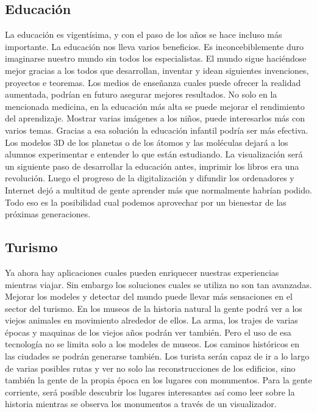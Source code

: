 \documentclass[a4paper,11pt]{scrartcl}
\begin{document}
\subsection{Educación}
La educación es vigentísima, y con el paso de los años se hace incluso más importante. La educación nos lleva varios beneficios. Es inconcebiblemente duro imaginarse nuestro mundo sin todos los especialistas. El mundo sigue haciéndose mejor gracias a los todos que desarrollan, inventar y idean siguientes invenciones, proyectos e teoremas. Los medios de enseñanza cuales puede ofrecer la realidad aumentada, podrían en futuro asegurar mejores resultados. No solo en la mencionada medicina, en la educación más alta se puede mejorar el rendimiento del aprendizaje. Mostrar varias imágenes a los niños, puede interesarlos más con varios temas. Gracias a esa solución la educación infantil podría ser más efectiva. Los modelos 3D de los planetas o de los átomos y las moléculas dejará a los alumnos experimentar e entender lo que están estudiando. La visualización será un siguiente paso de desarrollar la educación antes, imprimir los libros era una revolución. Luego el progreso de la digitalización y difundir los ordenadores y Internet dejó a multitud de gente aprender más que normalmente habrían podido. Todo eso es la posibilidad cual podemos aprovechar por un bienestar de las próximas generaciones.
 
\subsection{Turismo}
Ya ahora hay aplicaciones cuales pueden enriquecer nuestras experiencias mientras viajar. Sin embargo los soluciones cuales se utiliza no son tan avanzadas. Mejorar los modeles y detectar del mundo puede llevar más sensaciones en el sector del turismo. En los museos de la historia natural la gente podrá ver a los viejos animales en movimiento alrededor de ellos. La arma, los trajes de varias épocas y maquinas de los viejos años podrán ver también. Pero el uso de esa tecnología no se limita solo a los modeles de museos. Los caminos históricos en las ciudades se podrán generarse también. Los turista serán capaz de ir a lo largo de varias posibles rutas y ver no solo las reconstrucciones de los edificios, sino también la gente de la propia época en los lugares con monumentos. Para la gente corriente, será posible descubrir los lugares interesantes así como leer sobre la historia mientras se observa los monumentos a través de un visualizador.
 
\end{document}
